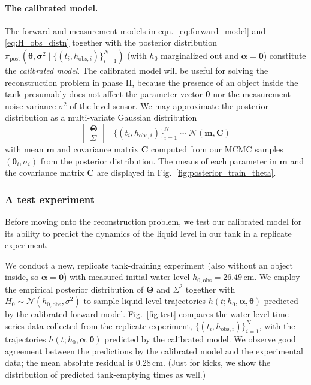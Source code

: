 \documentclass[openacc]{rsproca_new}%
\newcommand\thedata {$\{(t_i,h_{\text{obs}, i})\}_{i=1}^{N}$\xspace}
\newcommand\thedatanomath {\{(t_i,h_{\text{obs}, i})\}_{i=1}^{N}}
\newcommand\themodel {$h(t; h_0, \boldsymbol \alpha, \boldsymbol\theta)$\xspace}
\begin{document}
\paragraph{The calibrated model.} The forward and measurement models in eqn.~\ref{eq:forward_model} and \ref{eq:H_obs_distn} together with the posterior distribution $\pi_{\text{post}}(\boldsymbol \theta, \boldsymbol \sigma^2 \mid \thedatanomath)$ (with $h_0$ marginalized out and $\boldsymbol \alpha=\mathbf{0}$) constitute the \emph{calibrated model}.
 The calibrated model will be useful for solving the reconstruction problem in phase II, because the presence of an object inside the tank presumably does not affect the parameter vector $\boldsymbol \theta$ nor the measurement noise variance $\sigma^2$ of the level sensor.
We may approximate the posterior distribution as a multi-variate Gaussian distribution
\begin{equation}
	\begin{bmatrix} \boldsymbol \Theta \\ \Sigma \end{bmatrix} \mid \thedatanomath \sim \mathcal{N}(\mathbf{m}, \mathbf{C}) \label{eq:post_theta_sigma}
\end{equation}
with mean $\mathbf{m}$ and covariance matrix $\mathbf{C}$ computed from our MCMC samples $(\boldsymbol \theta_i, \sigma_i)$ from the posterior distribution. 
The means of each parameter in $\mathbf{m}$ and the covariance matrix $\mathbf{C}$ are displayed in Fig.~\ref{fig:posterior_train_theta}. 

\subsubsection{A test experiment}
Before moving onto the reconstruction problem, we test our calibrated model for its ability to predict the dynamics of the liquid level in our tank in a replicate experiment.

We conduct a new, replicate tank-draining experiment (also without an object inside, so $\boldsymbol \alpha=\mathbf{0}$) with measured initial water level $h_{0, \text{obs}}=26.49$\,cm. 
We employ the empirical posterior distribution of $\boldsymbol \Theta$ and $\Sigma^2$ together with $H_0\sim \mathcal{N}(h_{0, \text{obs}}, \sigma^2)$ to sample liquid level trajectories \themodel predicted by the calibrated forward model. 
Fig.~\ref{fig:test} compares the water level time series data collected from the replicate experiment, \thedata, with the trajectories \themodel predicted by the calibrated model. We observe good agreement between the predictions by the calibrated model and the experimental data; the mean absolute residual is 0.28\,cm. (Just for kicks, we show the distribution of predicted tank-emptying times as well.)
\end{document}
